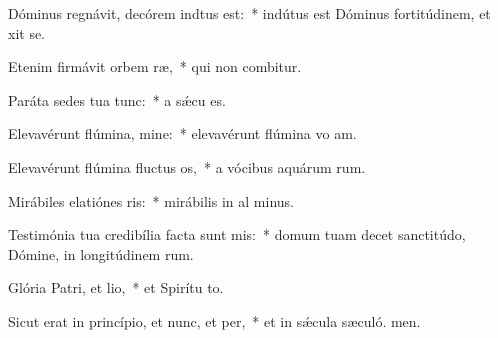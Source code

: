 \item Dóminus regnávit, decórem indtus est:~* indútus est Dóminus fortitúdinem, et xit se.
\item Etenim firmávit orbem ræ,~* qui non combitur.
\item Paráta sedes tua  tunc:~* a sǽcu  es.
\item Elevavérunt flúmina, mine:~* elevavérunt flúmina vo am.
\item Elevavérunt flúmina fluctus os,~* a vócibus aquárum rum.
\item Mirábiles elatiónes ris:~* mirábilis in al minus.
\item Testimónia tua credibília facta sunt mis:~* domum tuam decet sanctitúdo, Dómine, in longitúdinem rum.
\item Glória Patri, et lio,~* et Spirítu to.
\item Sicut erat in princípio, et nunc, et per,~* et in sǽcula sæculó. men.
